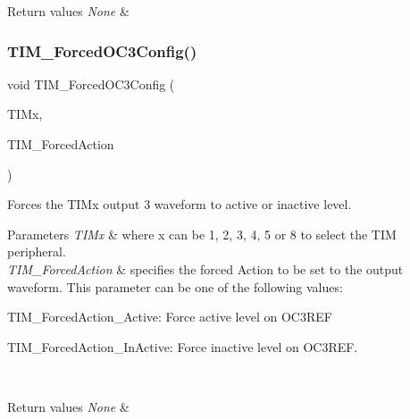 \begin{DoxyRetVals}{Return values}
{\em None} & \\
\hline
\end{DoxyRetVals}
\mbox{\label{group___t_i_m___private___functions_ga920b0fb4ca44fceffd1c3e441feebd8f}} 
\subsubsection{\texorpdfstring{TIM\_ForcedOC3Config()}{TIM\_ForcedOC3Config()}}
{\footnotesize\ttfamily void T\+I\+M\+\_\+\+Forced\+O\+C3\+Config (\begin{DoxyParamCaption}\item[{\mbox{\hyperlink{struct_t_i_m___type_def}{T\+I\+M\+\_\+\+Type\+Def}} $\ast$}]{T\+I\+Mx,  }\item[{uint16\+\_\+t}]{T\+I\+M\+\_\+\+Forced\+Action }\end{DoxyParamCaption})}



Forces the T\+I\+Mx output 3 waveform to active or inactive level. 


\begin{DoxyParams}{Parameters}
{\em T\+I\+Mx} & where x can be 1, 2, 3, 4, 5 or 8 to select the T\+IM peripheral. \\
\hline
{\em T\+I\+M\+\_\+\+Forced\+Action} & specifies the forced Action to be set to the output waveform. This parameter can be one of the following values\+: \begin{DoxyItemize}
\item T\+I\+M\+\_\+\+Forced\+Action\+\_\+\+Active\+: Force active level on O\+C3\+R\+EF \item T\+I\+M\+\_\+\+Forced\+Action\+\_\+\+In\+Active\+: Force inactive level on O\+C3\+R\+EF. \end{DoxyItemize}
\\
\hline
\end{DoxyParams}

\begin{DoxyRetVals}{Return values}
{\em None} & \\
\hline
\end{DoxyRetVals}
\mbox{\label{group___t_i_m___private___functions_gaf0a0bbe74251e56d4b835d20b0a3aa63}} 
